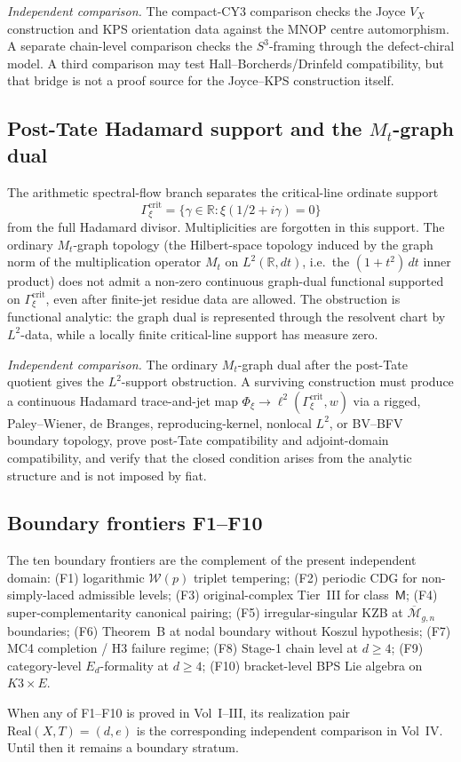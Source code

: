 \noindent\emph{Independent comparison.} The compact-CY3 comparison
checks the Joyce \(V_X\) construction and KPS orientation data
against the MNOP centre automorphism. A separate chain-level comparison
checks the \(S^3\)-framing through the defect-chiral model. A third
comparison may test Hall--Borcherds/Drinfeld compatibility, but that
bridge is not a proof source for the Joyce--KPS construction itself.

\subsection{Post-Tate Hadamard support and the \texorpdfstring{\(M_t\)}{Mt}-graph dual}
\label{v4-subsec:post-tate-hadamard-meyer}

The arithmetic spectral-flow branch separates the critical-line
ordinate support
\[
 \Gamma_\xi^{\mathrm{crit}}
 = \{\gamma\in \mathbb R:\xi(1/2+i\gamma)=0\}
\]
from the full Hadamard divisor. Multiplicities are forgotten in this
support. The ordinary \(M_t\)-graph topology (the Hilbert-space
topology induced by the graph norm of the multiplication operator
\(M_t\) on \(L^2(\mathbb R, dt)\), i.e.\ the \((1+t^2)\,dt\) inner
product) does not admit a non-zero continuous graph-dual functional
supported on \(\Gamma_\xi^{\mathrm{crit}}\), even after finite-jet
residue data are allowed. The obstruction is functional analytic:
the graph dual is represented through the resolvent chart by
\(L^2\)-data, while a locally finite critical-line support has
measure zero.

\noindent\emph{Independent comparison.} The ordinary \(M_t\)-graph
dual after the post-Tate quotient gives the \(L^2\)-support
obstruction. A surviving construction must produce a continuous Hadamard
trace-and-jet map
\(\Phi_\xi\to \ell^2(\Gamma_\xi^{\mathrm{crit}},w)\)
via a rigged, Paley--Wiener, de Branges, reproducing-kernel,
nonlocal \(L^2\), or BV--BFV boundary topology, prove post-Tate
compatibility and adjoint-domain compatibility, and verify that the
closed condition arises from the analytic structure and is not
imposed by fiat.

\subsection{Boundary frontiers F1--F10}
\label{v4-subsec:boundary-frontiers}

The ten boundary frontiers are the complement of the present
independent domain: (F1) logarithmic \(\mathcal{W}(p)\) triplet tempering;
(F2) periodic CDG for non-simply-laced admissible levels;
(F3) original-complex Tier~III for class~\(\mathsf M\);
(F4) super-complementarity canonical pairing;
(F5) irregular-singular KZB at \(\overline{\mathcal{M}}_{g,n}\) boundaries;
(F6) Theorem~B at nodal boundary without Koszul hypothesis;
(F7) MC4 completion / H3 failure regime;
(F8) Stage-1 chain level at \(d \ge 4\);
(F9) category-level \(E_d\)-formality at \(d \ge 4\);
(F10) bracket-level BPS Lie algebra on \(K3\times E\).

When any of F1--F10 is proved in Vol~I--III, its realization pair
\(\mathrm{Real}(X, T) = (d, e)\) is the corresponding independent
comparison in Vol~IV. Until then it remains a boundary stratum.

